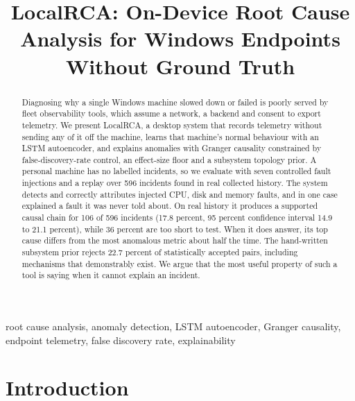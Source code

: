 \documentclass[conference,a4paper]{IEEEtran}
\begin{document}
\title{LocalRCA: On-Device Root Cause Analysis for Windows Endpoints Without
Ground Truth}

\author{
}

\maketitle

\begin{abstract}
Diagnosing why a single Windows machine slowed down or failed is poorly served
by fleet observability tools, which assume a network, a backend and consent to
export telemetry. We present LocalRCA, a desktop system that records telemetry
without sending any of it off the machine, learns that machine's normal
behaviour with an LSTM autoencoder, and explains anomalies with Granger
causality constrained by false-discovery-rate control, an effect-size floor and
a subsystem topology prior. A personal machine has no labelled incidents, so we
evaluate with seven controlled fault injections and a replay over 596 incidents
found in real collected history. The system detects and correctly attributes
injected CPU, disk and memory faults, and in one case explained a fault it was
never told about. On real history it produces a supported causal chain for
106 of 596 incidents (17.8 percent, 95 percent confidence interval 14.9 to
21.1 percent), while 36 percent are too short to test. When it does answer, its top cause differs from the most
anomalous metric about half the time. The
hand-written subsystem prior rejects 22.7 percent of statistically accepted pairs,
including mechanisms that demonstrably exist. We argue that the most useful
property of such a tool is saying when it cannot explain an incident.
\end{abstract}

\begin{IEEEkeywords}
root cause analysis, anomaly detection, LSTM autoencoder, Granger causality,
endpoint telemetry, false discovery rate, explainability
\end{IEEEkeywords}

\section{Introduction}
\end{document}
